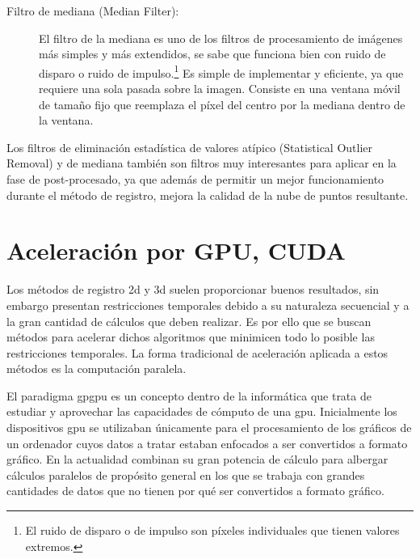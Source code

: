 \begin{description}
    \item[Filtro de mediana (Median Filter):]
    
    El filtro de la mediana es uno de los filtros de procesamiento de imágenes más simples y más extendidos, se sabe que funciona bien con ruido de disparo o ruido de impulso.\footnote{El ruido de disparo o de impulso son píxeles individuales que tienen valores extremos.}
    Es simple de implementar y eficiente, ya que requiere una sola pasada sobre la imagen. Consiste en una ventana móvil de tamaño fijo que reemplaza el píxel del centro por la mediana dentro de la ventana.

\end{description}

Los filtros de eliminación estadística de valores atípico (Statistical Outlier Removal) y de mediana también son filtros muy interesantes para aplicar en la fase de post-procesado, ya que además de permitir un mejor funcionamiento durante el método de registro, mejora la calidad de la nube de puntos resultante.

\section{Aceleración por GPU, CUDA}

Los métodos de registro \gls{2d} y \gls{3d} suelen proporcionar buenos resultados, sin embargo presentan restricciones temporales debido a su naturaleza secuencial y a la gran cantidad de cálculos que deben realizar.
Es por ello que se buscan métodos para acelerar dichos algoritmos que minimicen todo lo posible las restricciones temporales.
La forma tradicional de aceleración aplicada a estos métodos es la computación paralela.

El paradigma \gls{gpgpu} \citep{Luebke2006} es un concepto dentro de la informática que trata de estudiar y aprovechar las capacidades de cómputo de una \gls{gpu}.
Inicialmente los dispositivos \gls{gpu} se utilizaban únicamente para el procesamiento de los gráficos de un ordenador cuyos datos a tratar estaban enfocados a ser convertidos a formato gráfico.
En la actualidad combinan su gran potencia de cálculo para albergar cálculos paralelos de propósito general en los que se trabaja con grandes cantidades de datos que no tienen por qué ser convertidos a formato gráfico.

